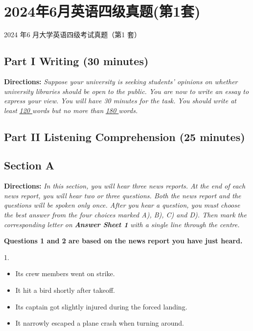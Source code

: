 \documentclass[UTF8,11pt]{ctexart}
\begin{document}
\section*{2024年6月英语四级真题(第1套)}
2024 年6 月大学英语四级考试真题（第1 套）


\subsection*{\textbf{Part I Writing} \textbf{(30 minutes)}}


\textbf{Directions:} \textit{Suppose your university is seeking students’ opinions on whether university libraries should be open} \textit{to the public. You are now to write an essay to express your view. You will have 30 minutes for the task. You should} \textit{write at least }\textit{\uline{120 }}\textit{words but no more than }\textit{\uline{180 }}\textit{words.}


\subsection*{\textbf{Part II} \textbf{Listening Comprehension} \textbf{(25 minutes)}}


\subsection*{\textbf{Section A}}


\textbf{Directions:} \textit{In this section, you will hear three news reports. At the end of each news report, you will hear two or} \textit{three questions. Both the news report and the questions will be spoken only once. After you hear a question, you} \textit{must choose the best answer from the four choices marked A), B), C) and D). Then mark the corresponding letter} \textit{on }\textbf{\textit{Answer Sheet 1}}\textit{ with a single line through the centre.}


\textbf{Questions 1 and 2 are based on the news report you have just heard.}


1.


\begin{itemize}[leftmargin=2em,itemsep=.2em,topsep=.4em]\item[A.] Its crew members went on strike.
\item[B.] It hit a bird shortly after takeoff.
\item[C.] Its captain got slightly injured during the forced landing.
\item[D.] It narrowly escaped a plane crash when turning around.
\end{itemize}
\end{document}
